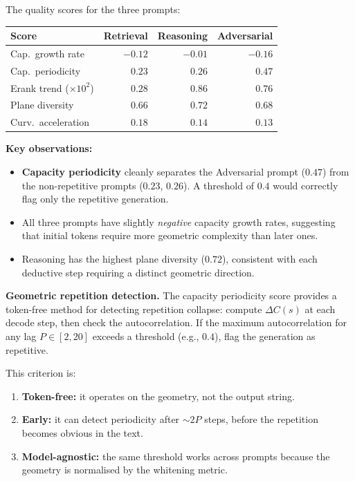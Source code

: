 \documentclass[11pt, twoside, openright]{memoir}
\numberwithin{equation}{chapter}
\begin{document}
\begin{finding}
The quality scores for the three prompts:

\medskip
\begin{center}
\renewcommand{\arraystretch}{1.3}\small
\begin{tabular}{@{}l r r r@{}}
\toprule
\textbf{Score} & \textbf{Retrieval} & \textbf{Reasoning} &
  \textbf{Adversarial} \\
\midrule
Cap.\ growth rate & $-0.12$ & $-0.01$ & $-0.16$ \\
Cap.\ periodicity & $0.23$ & $0.26$ & $\mathbf{0.47}$ \\
Erank trend ($\times 10^2$) & $0.28$ & $0.86$ & $0.76$ \\
Plane diversity & $0.66$ & $\mathbf{0.72}$ & $0.68$ \\
Curv.\ acceleration & $0.18$ & $0.14$ & $0.13$ \\
\bottomrule
\end{tabular}
\end{center}

\medskip
\textbf{Key observations:}

\begin{itemize}[nosep]
\item \textbf{Capacity periodicity} cleanly separates the
  Adversarial prompt ($0.47$) from the non-repetitive prompts
  ($0.23$, $0.26$).  A threshold of $0.4$ would correctly flag
  only the repetitive generation.
\item All three prompts have slightly \emph{negative} capacity
  growth rates, suggesting that initial tokens require more
  geometric complexity than later ones.
\item Reasoning has the highest plane diversity ($0.72$),
  consistent with each deductive step requiring a distinct
  geometric direction.
\end{itemize}
\end{finding}

\begin{keyidea}
\textbf{Geometric repetition detection.}
The capacity periodicity score provides a token-free method for
detecting repetition collapse: compute $\Delta C(s)$ at each
decode step, then check the autocorrelation.  If the
maximum autocorrelation for any lag $P \in [2, 20]$ exceeds a
threshold (e.g., $0.4$), flag the generation as repetitive.

This criterion is:
\begin{enumerate}[nosep]
\item \textbf{Token-free:} it operates on the geometry, not the
  output string.
\item \textbf{Early:} it can detect periodicity after
  $\sim\!2P$ steps, before the repetition becomes obvious in the
  text.
\item \textbf{Model-agnostic:} the same threshold works across
  prompts because the geometry is normalised by the whitening
  metric.
\end{enumerate}
\end{keyidea}
\end{document}
